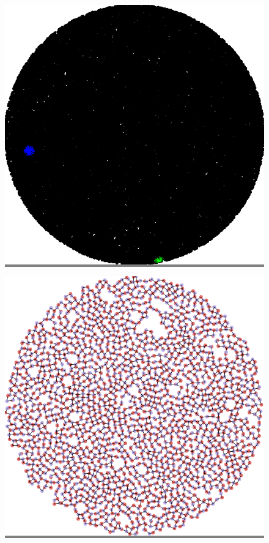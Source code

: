 \documentclass{article}
\begin{document}
\begin{figure}
\begin{minipage}{0.3\textwidth}
    \end{minipage}
    \vskip 0.1in
    \begin{minipage}{0.3\textwidth}
    \colorbox{gray}{\includegraphics[width=\linewidth]{./images/disk_2.png}}
    \end{minipage}
    \hspace{\fill}
    \begin{minipage}{0.3\textwidth}
    \colorbox{gray}{\includegraphics[width=\linewidth]{./images/disk_2_bb_0.png}}

\end{minipage}
\end{figure}
\end{document}
